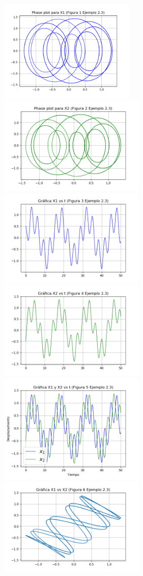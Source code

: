 \documentclass[a4paper]{article}
\begin{document}
\begin{figure}[ht!]
\centering 
\includegraphics[width=65mm]{Figura1Ex2_3.png}
\includegraphics[width=70mm]{Figura2Ex2_3.png}
\includegraphics[width=70mm]{Figura3Ex2_3.png}
\includegraphics[width=70mm]{Figura4Ex2_3.png}
\includegraphics[width=70mm]{Figura5Ex2_3.png}
\includegraphics[width=70mm]{Figura6Ex2_3.png}
\end{figure}
\end{document}
